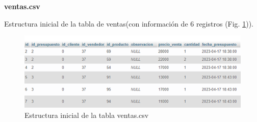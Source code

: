 \textbf{ventas.csv}

Estructura inicial de la tabla de ventas(con información de 6 registros (Fig. \ref{fig:ventas_original})).

\begin{figure}[H]
  \begin{center}
    \includegraphics[scale=0.90]{./tabla_inicial_venta.png}
    \caption{Estructura inicial de la tabla  ventas.csv}
    \label{fig:ventas_original}
  \end{center}
\end{figure}






